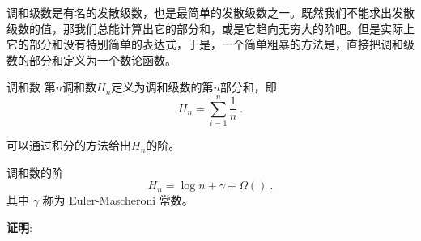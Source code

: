 

调和级数是有名的发散级数，也是最简单的发散级数之一。既然我们不能求出发散级数的值，那我们总能计算出它的部分和，或是它趋向无穷大的阶吧。但是实际上它的部分和没有特别简单的表达式，于是，一个简单粗暴的方法是，直接把调和级数的部分和定义为一个数论函数。

\begin{definition}{调和数}
第$n$调和数$H_n$定义为调和级数的第$n$部分和，即
\begin{equation}
H_n = \sum_{i=1}^n\frac{1}{n}~.
\end{equation}
\end{definition}

可以通过积分的方法给出$H_n$的阶。

\begin{theorem}{调和数的阶}
\begin{equation}
H_n = \log n + \gamma + \Omega() ~.
\end{equation}
其中 $\gamma$ 称为 Euler-Mascheroni 常数。
\end{theorem}

\textbf{证明}:

